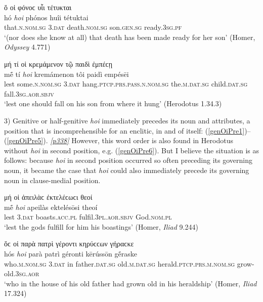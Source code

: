 \begin{exe}
\ex ὅ οἱ φόνοϲ {υἷι} τέτυκται\\
\gll hó \emph{hoi} phónos {huîi} tétuktai\\
that.\textsc{n.nom.sg} \textsc{3.dat} death.\textsc{nom.sg} son.\textsc{gen.sg} ready.\textsc{3sg.pf}\\
\trans `(nor does she know at all) that death has been made ready for her son' (Homer, \emph{Odyssey} 4.771)
\label{genOiSep5}
\end{exe}

\begin{exe}
\ex μή τί {οἱ} κρεμάμενον τῷ {παιδὶ} ἐμπέϲῃ\\
\gll mḗ tí \emph{hoi} kremámenon tôi paidì empésēi\\
lest some.\textsc{n.nom.sg} \textsc{3.dat} hang.\textsc{ptcp.prs.pass.n.nom.sg} the.\textsc{m.dat.sg} child.\textsc{dat.sg} fall.\textsc{3sg.aor.sbjv}\\
\trans `lest one should fall on his son from where it hung' (Herodotus 1.34.3)
\label{genOiSep6}
\end{exe}

3) Genitive or half-genitive \emph{hoi} immediately precedes its noun and attributes, a position that is incomprehensible for an enclitic, in and of itself: (\ref{genOiPre1})--(\ref{genOiPre5}). \hyperlink{p338}{\emph{[p338]}} However, this word order is also found in Herodotus without \emph{hoi} in second position, e.g. (\ref{genOiPre6}). But I believe the situation is as follows: because \emph{hoi} in second position occurred so often preceding its governing noun, it became the case that \emph{hoi} could also immediately precede its governing noun in clause-medial position.

\begin{exe}
\ex μή {οἱ} {ἀπειλὰϲ} ἐκτελέϲωϲι θεοί\\
\gll mḗ \emph{hoi} {apeilàs} ektelésōsi theoí\\
lest \textsc{3.dat} boasts.\textsc{acc.pl} fulfil.\textsc{3pl.aor.sbjv} God.\textsc{nom.pl}\\
\trans `lest the gods fulfill for him his boastings' (Homer, \emph{Iliad} 9.244)
\label{genOiPre1}
\end{exe}

\begin{exe}
\ex ὅϲ οἱ παρὰ πατρὶ γέροντι κηρύϲϲων γήραϲκε\\
\gll hós \emph{hoi} {parà} {patrì} {géronti} kērússōn gḗraske\\
who.\textsc{m.nom.sg} \textsc{3.dat} in father.\textsc{dat.sg} old.\textsc{m.dat.sg} herald.\textsc{ptcp.prs.m.nom.sg} grow-old.\textsc{3sg.aor}\\
\trans `who in the house of his old father had grown old in his heraldship' (Homer, \emph{Iliad} 17.324)
\label{genOiPre2}
\end{exe}

